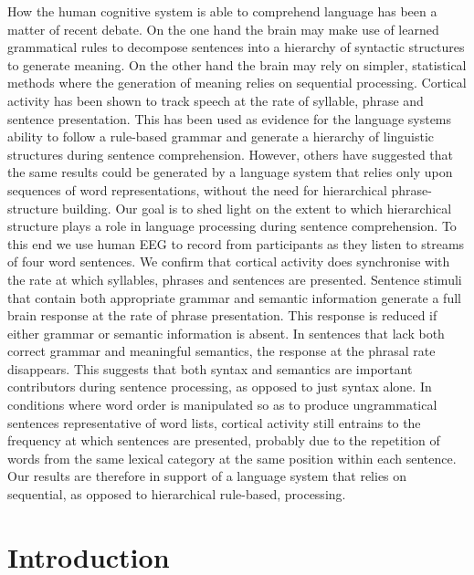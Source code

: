\documentclass[10pt,letterpaper]{article}
\begin{document}
How the human cognitive system is able to comprehend language has been
a matter of recent debate. 
%
%
On the one hand the brain may make use of
learned grammatical rules to decompose sentences into a hierarchy of
syntactic structures to generate meaning. On the other hand the brain
may rely on simpler, statistical methods where the generation of
meaning relies on sequential processing. 
%
%
Cortical activity has been
shown to track speech at the rate of syllable, phrase and sentence
presentation. This has been used as evidence for the language systems
ability to follow a rule-based grammar and generate a hierarchy of
linguistic structures during sentence comprehension. 
%
%
However, others
have suggested that the same results could be generated by a language
system that relies only upon sequences of word representations,
without the need for hierarchical phrase-structure building. 
%
%
Our goal
is to shed light on the extent to which hierarchical structure plays a
role in language processing during sentence comprehension. To this end
we use human EEG to record from participants as they listen to streams
of four word sentences. 
%
%
We confirm that cortical activity does
synchronise with the rate at which syllables, phrases and sentences
are presented. 
%
%
Sentence stimuli that contain both appropriate grammar
and semantic information generate a full brain response at the rate of
phrase presentation. This response is reduced if either grammar or
semantic information is absent. In sentences that lack both correct
grammar and meaningful semantics, the response at the phrasal rate
disappears. 
%
%
This suggests that both syntax and semantics are important
contributors during sentence processing, as opposed to just syntax
alone. 
%
%
In conditions where word order is manipulated so as to produce
ungrammatical sentences representative of word lists, cortical
activity still entrains to the frequency at which sentences are
presented, probably due to the repetition of words from the same
lexical category at the same position within each sentence. Our
results are therefore in support of a language system that relies on
sequential, as opposed to hierarchical rule-based, processing.

\section*{Introduction}


\end{document}
